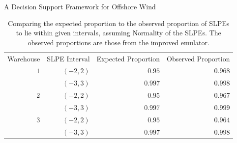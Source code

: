 \begin{chapter}{A Decision Support Framework for Offshore Wind \label{Ch:ds-for-ow}}
\begin{table}
 \centering
 \begin{tabular}{rrrr}
  \toprule
  Warehouse & SLPE Interval & Expected Proportion & Observed Proportion \\\cmidrule{1-4}
  $1$ & $(-2,2)$&$0.95$ & $0.968$\\
  &$(-3,3)$& $0.997$ & $0.998$ \\\cmidrule{1-4}
  $2$ & $(-2,2)$&$0.95$ & $0.967$\\
  &$(-3,3)$& $0.997$ & $0.999$ \\\cmidrule{1-4}
  $3$ &$(-2,2)$& $0.95$ & $0.964$\\
  &$(-3,3)$& $0.997$ & $0.998$ \\\bottomrule
 \end{tabular}
 \caption{Comparing the expected proportion to the observed proportion of SLPEs to lie within given intervals, assuming Normality of the SLPEs. The observed proportions are those from the improved emulator.}
 \label{Tab:cred1}
\end{table}

\end{chapter}
